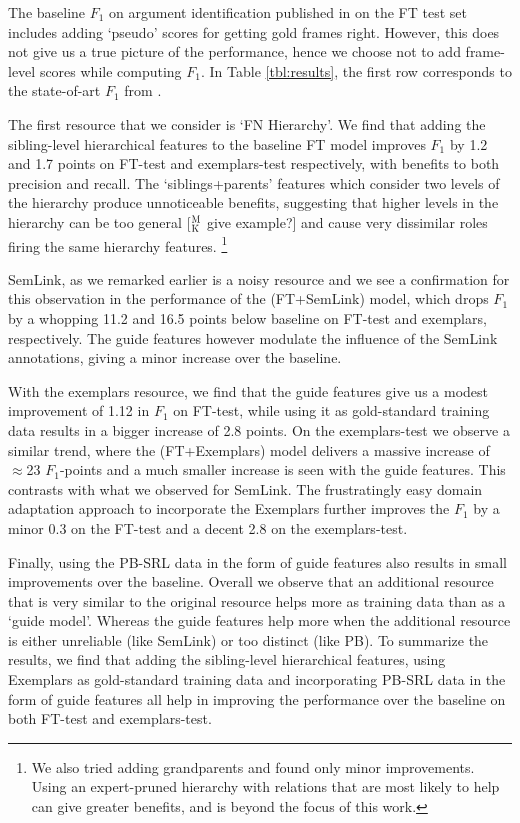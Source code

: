 \documentclass[11pt,a4paper]{article}
\newcommand{\ensuretext}[1]{#1}
\newcommand{\mkmarker}{\ensuretext{\textcolor{mdgreen}{\ensuremath{^{\textsc{M}}_{\textsc{K}}}}}}
\newcommand{\arkcomment}[3]{\ensuretext{\textcolor{#3}{[#1 #2]}}}
\newcommand{\mk}[1]{\arkcomment{\mkmarker}{#1}{mdgreen}}
\begin{document}


The baseline $F_1$ on argument identification published in \citet{das-14} on the FT test set includes adding `pseudo' scores for getting gold frames right. 
However, this does not give us a true picture of the performance, hence we choose not to add frame-level scores while computing $F_1$. 
In Table \ref{tbl:results}, the first row corresponds to the state-of-art $F_1$ from \citet{das-14}.

The first resource that we consider is `FN Hierarchy'. We find that adding the sibling-level hierarchical features to the baseline FT model improves 
$F_1$ by 1.2 and 1.7 points on FT-test and exemplars-test respectively,
with benefits to both precision and recall. The `siblings+parents' features which consider two levels of the hierarchy produce unnoticeable benefits,
suggesting that higher levels in the hierarchy can be too general \mk{give example?} and cause very dissimilar roles firing the same hierarchy features.%
\footnote{We also tried adding grandparents and found only minor improvements. Using an expert-pruned hierarchy with relations that are
most likely to help can give greater benefits, and is beyond the focus of this work.}

SemLink, as we remarked earlier is a noisy resource and we see a confirmation for this observation in the performance of the (FT+SemLink) model,
which drops $F_1$ by a whopping 11.2 and 16.5 points below baseline on FT-test and exemplars, respectively. The guide features however modulate the influence
of the SemLink annotations, giving a minor increase over the baseline. 

With the exemplars resource, we find that the guide features give us a modest improvement of 1.12 in $F_1$ on FT-test, 
while using it as gold-standard training data results in a bigger increase of 2.8 points. 
On the exemplars-test we observe a similar trend, where the (FT+Exemplars) model delivers a massive increase of $\approx$23 $F_1$-points and a 
much smaller increase is seen with the guide features. This contrasts with what we observed for SemLink.
The frustratingly easy domain adaptation approach to incorporate the Exemplars
further improves the $F_1$ by a minor 0.3 on the FT-test and a decent 2.8 on the exemplars-test.

Finally, using the PB-SRL data in the form of guide features also results in small improvements over the baseline. 
Overall we observe that an additional resource that is very similar to the original resource helps more as training data than as a `guide model'.
Whereas the guide features help more when the additional resource is either unreliable (like SemLink) or too distinct (like PB). 
To summarize the results, we find that adding the sibling-level hierarchical features, using Exemplars as gold-standard training data and 
incorporating PB-SRL data in the form of guide features all help in improving the performance over the baseline on both FT-test and exemplars-test.
 
\end{document}
